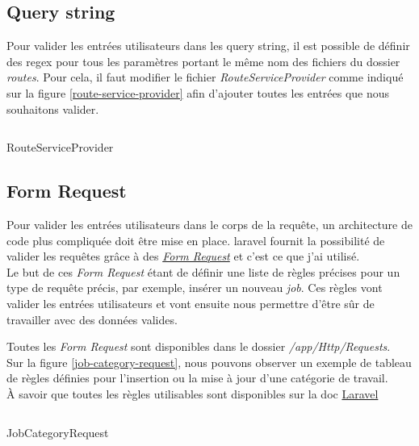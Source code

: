 \documentclass[
    iai, %
    il, %
]{heig-tb}
\begin{document}
\subsection{Query string}
Pour valider les entrées utilisateurs dans les query string, il est possible de définir des \Gls{regex} pour tous les paramètres portant le même nom des fichiers du dossier \emph{routes}.
Pour cela, il faut modifier le fichier \emph{RouteServiceProvider} comme indiqué sur la figure \ref{route-service-provider} afin d'ajouter toutes les entrées que nous souhaitons valider.

\begin{listing}[h]
    \inputminted{php}{assets/code/RouteServiceProvider.php}
    \caption{RouteServiceProvider \label{route-service-provider}}
\end{listing}

\subsection{Form Request}
Pour valider les entrées utilisateurs dans le corps de la requête, un architecture de code plus compliquée doit être mise en place. \Gls{laravel} fournit la possibilité de valider les requêtes grâce à des \href{https://laravel.com/docs/9.x/validation#form-request-validation}{\emph{Form Request}} et c'est ce que j'ai utilisé. \\
Le but de ces \emph{Form Request} étant de définir une liste de règles précises pour un type de requête précis, par exemple, insérer un nouveau \emph{job}. Ces règles vont valider les entrées utilisateurs et vont ensuite nous permettre d'être sûr de travailler avec des données valides.

Toutes les \emph{Form Request} sont disponibles dans le dossier \emph{/app/Http/Requests}. \\
Sur la figure \ref{job-category-request}, nous pouvons observer un exemple de tableau de règles définies pour l'insertion ou la mise à jour d'une catégorie de travail. \\
À savoir que toutes les règles utilisables sont disponibles sur la doc \href{https://laravel.com/docs/9.x/validation#available-validation-rules}{Laravel}

\begin{listing}[H]
    \inputminted{php}{assets/code/JobCategoryRequest.php}
    \caption{JobCategoryRequest \label{job-category-request}}
\end{listing}

\newpage
\end{document}

